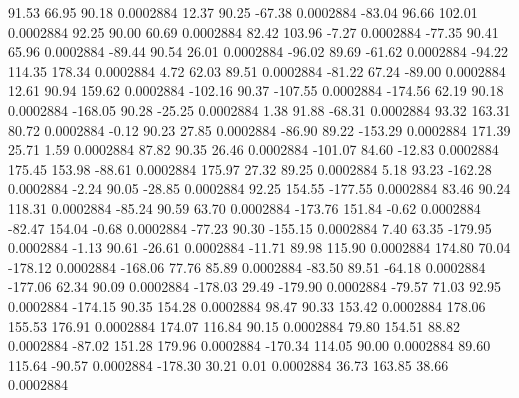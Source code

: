        91.53       66.95       90.18     0.0002884
       12.37       90.25      -67.38     0.0002884
      -83.04       96.66      102.01     0.0002884
       92.25       90.00       60.69     0.0002884
       82.42      103.96       -7.27     0.0002884
      -77.35       90.41       65.96     0.0002884
      -89.44       90.54       26.01     0.0002884
      -96.02       89.69      -61.62     0.0002884
      -94.22      114.35      178.34     0.0002884
        4.72       62.03       89.51     0.0002884
      -81.22       67.24      -89.00     0.0002884
       12.61       90.94      159.62     0.0002884
     -102.16       90.37     -107.55     0.0002884
     -174.56       62.19       90.18     0.0002884
     -168.05       90.28      -25.25     0.0002884
        1.38       91.88      -68.31     0.0002884
       93.32      163.31       80.72     0.0002884
       -0.12       90.23       27.85     0.0002884
      -86.90       89.22     -153.29     0.0002884
      171.39       25.71        1.59     0.0002884
       87.82       90.35       26.46     0.0002884
     -101.07       84.60      -12.83     0.0002884
      175.45      153.98      -88.61     0.0002884
      175.97       27.32       89.25     0.0002884
        5.18       93.23     -162.28     0.0002884
       -2.24       90.05      -28.85     0.0002884
       92.25      154.55     -177.55     0.0002884
       83.46       90.24      118.31     0.0002884
      -85.24       90.59       63.70     0.0002884
     -173.76      151.84       -0.62     0.0002884
      -82.47      154.04       -0.68     0.0002884
      -77.23       90.30     -155.15     0.0002884
        7.40       63.35     -179.95     0.0002884
       -1.13       90.61      -26.61     0.0002884
      -11.71       89.98      115.90     0.0002884
      174.80       70.04     -178.12     0.0002884
     -168.06       77.76       85.89     0.0002884
      -83.50       89.51      -64.18     0.0002884
     -177.06       62.34       90.09     0.0002884
     -178.03       29.49     -179.90     0.0002884
      -79.57       71.03       92.95     0.0002884
     -174.15       90.35      154.28     0.0002884
       98.47       90.33      153.42     0.0002884
      178.06      155.53      176.91     0.0002884
      174.07      116.84       90.15     0.0002884
       79.80      154.51       88.82     0.0002884
      -87.02      151.28      179.96     0.0002884
     -170.34      114.05       90.00     0.0002884
       89.60      115.64      -90.57     0.0002884
     -178.30       30.21        0.01     0.0002884
       36.73      163.85       38.66     0.0002884
